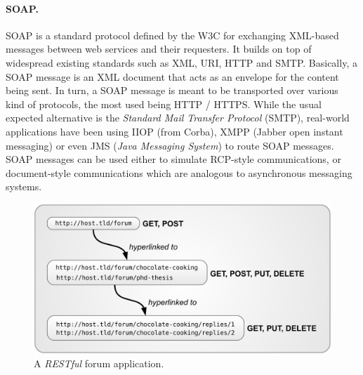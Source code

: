 \paragraph{SOAP.}
SOAP \cite{MGMH+03} is a standard protocol defined by the W3C for exchanging XML-based messages between web services and their requesters. It builds on top of widespread existing standards such as XML, URI, HTTP and SMTP. Basically, a SOAP message is an XML document that acts as an envelope for the content being sent. In turn, a SOAP message is meant to be transported over various kind of protocols, the most used being HTTP / HTTPS. While the usual expected alternative is the \emph{Standard Mail Transfer Protocol} (SMTP), real-world applications have been using IIOP (from Corba), XMPP (Jabber open instant messaging) or even JMS (\emph{Java Messaging System}) to route SOAP messages. SOAP messages can be used either to simulate RCP-style communications, or document-style communications which are analogous to asynchronous messaging systems.

\begin{figure}[htbp]
    \centering
    \includegraphics[width=\textwidth]{content/web-services/restful-forum}
    \caption{A \emph{RESTful} forum application.} 
    \label{fig:rest-forum}
\end{figure}

